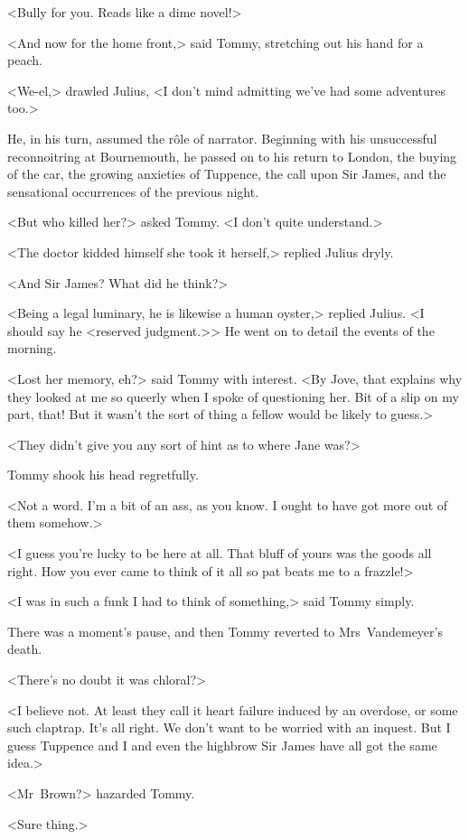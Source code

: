 <Bully for you. Reads like a dime novel!>

<And now for the home front,> said Tommy, stretching out his hand for a peach.

<We-el,> drawled Julius, <I don't mind admitting we've had some adventures too.>

He, in his turn, assumed the rôle of narrator. Beginning with his unsuccessful reconnoitring at Bournemouth, he passed on to his return to London, the buying of the car, the growing anxieties of Tuppence, the call upon Sir James, and the sensational occurrences of the previous night.

<But who killed her?> asked Tommy. <I don't quite understand.>

<The doctor kidded himself she took it herself,> replied Julius dryly.

<And Sir James? What did he think?>

<Being a legal luminary, he is likewise a human oyster,> replied Julius. <I should say he <reserved judgment.>> He went on to detail the events of the morning.

<Lost her memory, eh?> said Tommy with interest. <By Jove, that explains why they looked at me so queerly when I spoke of questioning her. Bit of a slip on my part, that! But it wasn't the sort of thing a fellow would be likely to guess.>

<They didn't give you any sort of hint as to where Jane was?>

Tommy shook his head regretfully.

<Not a word. I'm a bit of an ass, as you know. I ought to have got more out of them somehow.>

<I guess you're lucky to be here at all. That bluff of yours was the goods all right. How you ever came to think of it all so pat beats me to a frazzle!>

<I was in such a funk I had to think of something,> said Tommy simply.

There was a moment's pause, and then Tommy reverted to Mrs~Vandemeyer's death.

<There's no doubt it was chloral?>

<I believe not. At least they call it heart failure induced by an overdose, or some such claptrap. It's all right. We don't want to be worried with an inquest. But I guess Tuppence and I and even the highbrow Sir James have all got the same idea.>

<Mr~Brown?> hazarded Tommy.

<Sure thing.>

